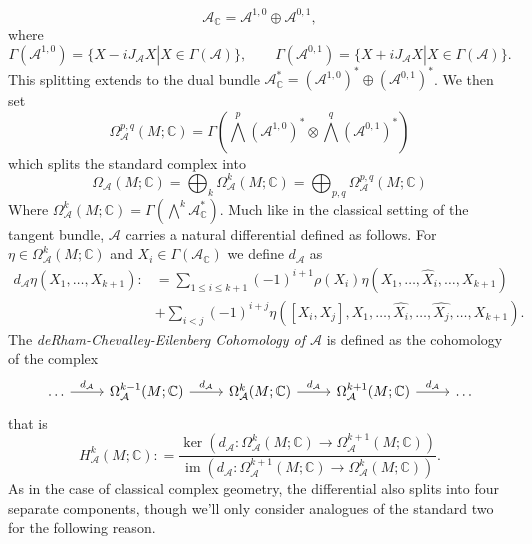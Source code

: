\documentclass{amsart}
\newcommand{\C}{\mathbb{C}}
\newcommand{\ra}{\rightarrow}
\theoremstyle{definition}
\newcommand{\A}{\mathcal{A}}
\theoremstyle{definition}
\DeclareMathOperator{\im}{im}
\begin{document}
\begin{equation*}
    \A_\C = \A^{1,0} \oplus \A^{0,1},
\end{equation*}
where 
\begin{equation*}
    \Gamma(\A^{1,0}) = \{X -iJ_\A X | X \in \Gamma(\A) \}, \qquad  \Gamma(\A^{0,1}) = \{X +iJ_\A X | X \in \Gamma(\A) \}.
\end{equation*}
This splitting extends to the dual bundle $\A^*_\C = (\A^{1,0})^*\oplus (\A^{0,1})^*$. We then set
\begin{equation*}
    \Omega^{p,q}_\A(M;\C) = \Gamma \left(\bigwedge^p(\A^{1,0})^* \otimes \bigwedge^q(\A^{0,1})^* \right)
\end{equation*}
which splits the standard complex into
\begin{equation*}
    \Omega_\A(M;\C) =\bigoplus_k \Omega_\A^k(M;\C)  = \bigoplus_{p,q}\Omega^{p,q}_\A(M;\C)
\end{equation*}
Where $\Omega_\A^k(M;\C) = \Gamma(\bigwedge^k\A^*_\C)$. Much like in the classical setting of the tangent bundle, $\A$ carries a natural differential defined as follows. For $\eta \in \Omega^k_\A(M;\C)$ and $X_i \in \Gamma(\A_\C)$ we define $d_\A$ as
\begin{align*}
    d_\A \eta (X_1,\dots ,X_{k+1}) :&= \sum_{1 \leq i \leq k+1} (-1)^{i+1}\rho(X_i) \eta (X_1,\dots ,\widehat{X}_i, \dots ,X_{k+1})\\
    &+ \sum_{i<j} (-1)^{i+j} \eta([X_i,X_j], X_1, \dots, \widehat{X_i}, \dots ,\widehat{X_j}, \dots, X_{k+1}).
\end{align*}
The \textit{deRham-Chevalley-Eilenberg Cohomology of $\A$} is defined as the cohomology of the complex
\[\begin{tikzcd}[ampersand replacement=\&]
	\dots \& {\Omega_\A^{k-1}(M;\C)} \& {\Omega_\A^k(M;\C)} \& {\Omega_\A^{k+1}(M;\C)} \& \dots
	\arrow["{d_\A}", from=1-1, to=1-2]
	\arrow["{d_\A}", from=1-2, to=1-3]
	\arrow["{d_\A}", from=1-3, to=1-4]
	\arrow["{d_\A}", from=1-4, to=1-5]
\end{tikzcd}\]
that is
\begin{equation*}
    H_\A^k(M;\C) : =\frac{\ker(d_\A: \Omega^k_\A(M;\C) \ra \Omega_\A^{k+1}(M;\C))}{\im(d_\A:\Omega_\A^{k+1}(M;\C) \ra \Omega_\A^k(M;\C))}.
\end{equation*}
 As in the case of classical complex geometry, the differential also splits into four separate components, though we'll only consider analogues of the standard two for the following reason.
\end{document}
